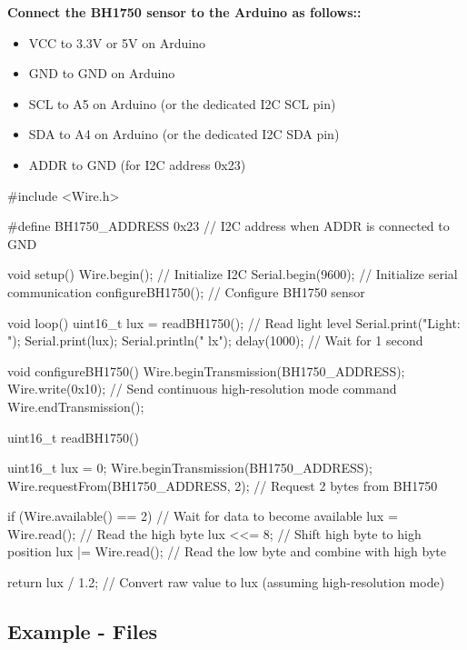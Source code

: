 \textbf{Connect the BH1750 sensor to the Arduino as follows::} 

\begin{itemize}
	\item VCC to 3.3V or 5V on Arduino
	\item GND to GND on Arduino
	\item SCL to A5 on Arduino (or the dedicated I2C SCL pin)
	\item SDA to A4 on Arduino (or the dedicated I2C SDA pin)
	\item ADDR to GND (for I2C address 0x23)
\end{itemize}



\begin{Arduino}
	#include <Wire.h>
	
	#define BH1750_ADDRESS 0x23 // I2C address when ADDR is connected to GND
	
	void setup() {
		Wire.begin(); // Initialize I2C
		Serial.begin(9600); // Initialize serial communication
		configureBH1750(); // Configure BH1750 sensor
	}
	
	void loop() {
		uint16_t lux = readBH1750(); // Read light level
		Serial.print("Light: ");
		Serial.print(lux);
		Serial.println(" lx");
		delay(1000); // Wait for 1 second
	}
	
	void configureBH1750() {
		Wire.beginTransmission(BH1750_ADDRESS);
		Wire.write(0x10); // Send continuous high-resolution mode command
		Wire.endTransmission();
	}
	
	uint16_t readBH1750() {
		uint16_t lux = 0;
		Wire.beginTransmission(BH1750_ADDRESS);
		Wire.requestFrom(BH1750_ADDRESS, 2); // Request 2 bytes from BH1750
		
		if (Wire.available() == 2) { // Wait for data to become available
			lux = Wire.read(); // Read the high byte
			lux <<= 8; // Shift high byte to high position
			lux |= Wire.read(); // Read the low byte and combine with high byte
		}
		
		return lux / 1.2; // Convert raw value to lux (assuming high-resolution mode)
	}
	
	
	
\end{Arduino}



\subsection{Example - Files}




